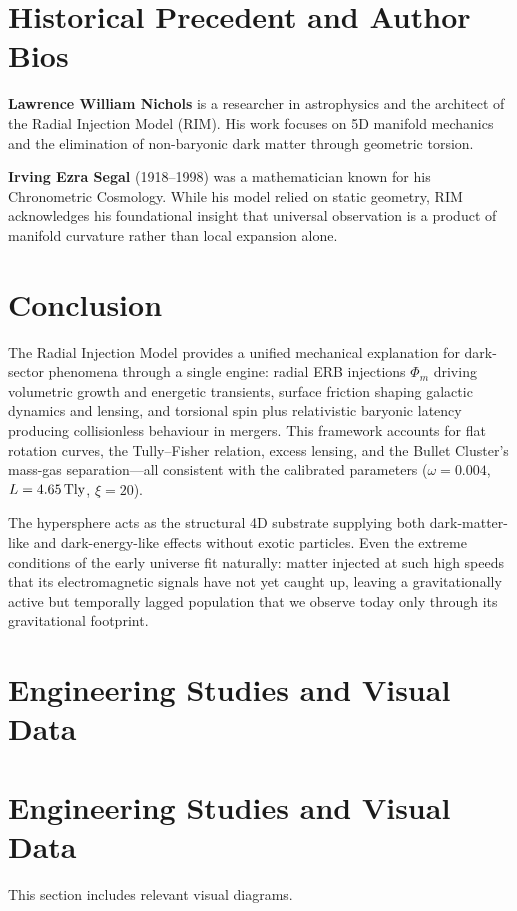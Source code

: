 \documentclass[11pt,a4paper]{article}
\begin{document}
\section*{Historical Precedent and Author Bios}

\textbf{Lawrence William Nichols} is a researcher in astrophysics and the architect of the Radial Injection Model (RIM). His work focuses on 5D manifold mechanics and the elimination of non-baryonic dark matter through geometric torsion.

\textbf{Irving Ezra Segal} (1918--1998) was a mathematician known for his Chronometric Cosmology. While his model relied on static geometry, RIM acknowledges his foundational insight that universal observation is a product of manifold curvature rather than local expansion alone.

\section{Conclusion}

The Radial Injection Model provides a unified mechanical explanation for dark-sector phenomena through a single engine: radial ERB injections $\Phi_m$ driving volumetric growth and energetic transients, surface friction shaping galactic dynamics and lensing, and torsional spin plus relativistic baryonic latency producing collisionless behaviour in mergers. This framework accounts for flat rotation curves, the Tully--Fisher relation, excess lensing, and the Bullet Cluster’s mass-gas separation—all consistent with the calibrated parameters ($\omega = 0.004$, $L = 4.65\,\rm Tly$, $\xi = 20$).

The hypersphere acts as the structural 4D substrate supplying both dark-matter-like and dark-energy-like effects without exotic particles. Even the extreme conditions of the early universe fit naturally: matter injected at such high speeds that its electromagnetic signals have not yet caught up, leaving a gravitationally active but temporally lagged population that we observe today only through its gravitational footprint.

\section{Engineering Studies and Visual Data}

\newpage

\section{Engineering Studies and Visual Data}
This section includes relevant visual diagrams.

\end{document}
